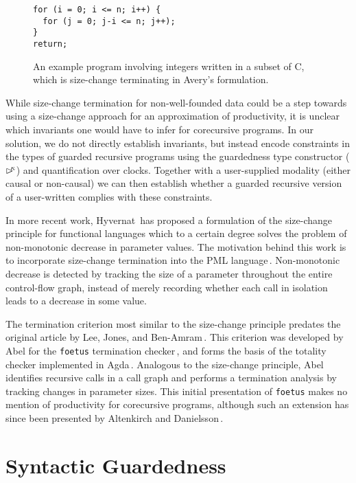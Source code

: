 \begin{figure}
\begin{lstlisting}
for (i = 0; i <= n; i++) {
  for (j = 0; j-i <= n; j++);
}
return;
\end{lstlisting}
\caption{An example program involving integers written in a subset of C, which is size-change terminating in Avery's formulation.}
\label{fig:avery_example}
\end{figure}

While size-change termination for non-well-founded data could be a step towards
using a size-change approach for an approximation of productivity, it is unclear
which invariants one would have to infer for corecursive programs. In our
solution, we do not directly establish invariants, but instead encode constraints
in the types of guarded recursive programs using the guardedness type
constructor ($\rhd^{\!\!\kappa}$) and quantification over clocks. Together with a
user-supplied modality (either causal or non-causal) we can then establish
whether a guarded recursive version of a user-written complies with these constraints.

In more recent work, Hyvernat\,\citep{Hyvernat13} has proposed a formulation of the size-change principle for functional languages which to a certain degree solves the problem of non-monotonic decrease in parameter values. The motivation behind this work is to incorporate size-change termination into the PML language\,\cite{PMLLanguage}. Non-monotonic decrease is detected by tracking the size of a parameter throughout the entire control-flow graph, instead of merely recording whether each call in isolation leads to a decrease in some value.

The termination criterion most similar to the size-change principle predates the original article by Lee, Jones, and Ben-Amram\,\citep{LeeJones01SizeChange}. This criterion was developed by Abel for the \texttt{foetus} termination checker\,\citep{Abel98foetus}, and forms the basis of the totality checker implemented in Agda\,\citep{Norell:thesis}. Analogous to the size-change principle, Abel identifies recursive calls in a call graph and performs a termination analysis by tracking changes in parameter sizes. This initial presentation of \texttt{foetus} makes no mention of productivity for corecursive programs, although such an extension has since been presented by Altenkirch and Danielsson\,\citep{AltenkirchNAD10}.

\section{Syntactic Guardedness}
\label{sec:synt-guard}

